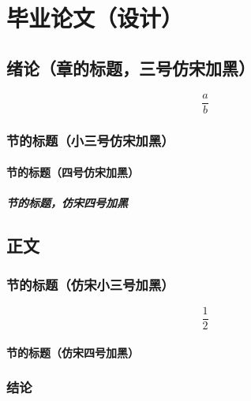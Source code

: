 %
\part{毕业论文（设计）}

\chapter{绪论（章的标题，三号仿宋加黑）}

\begin{equation}
\frac{a}{b}
\end{equation}

\section{节的标题（小三号仿宋加黑）}

\subsection{节的标题（四号仿宋加黑）}

\subsubsection{节的标题，仿宋四号加黑}
\cite{small}
\chapter{正文}

\section{节的标题（仿宋小三号加黑）}
\begin{equation}
\frac{1}{2}
\end{equation}
\subsection{节的标题（仿宋四号加黑）}

\section{结论}

\printbibliography[heading=chapbib]